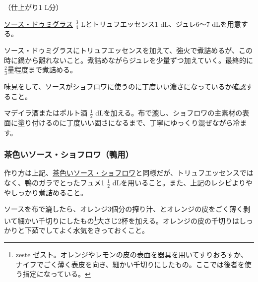 \begin{recette}


（仕上がり1 L分）

\protect\hyperlink{sauce-demi-glace}{ソース・ドゥミグラス}
\(\frac{3}{4}\) Lとトリュフエッセンス1 dL、ジュレ6〜7 dLを用意する。

ソース・ドゥミグラスにトリュフエッセンスを加えて、強火で煮詰めるが、この時に鍋から離れないこと。煮詰めながらジュレを少量ずつ加えていく。最終的に\(\frac{2}{3}\)量程度まで煮詰める。

味見をして、ソースがショフロワに使うのに丁度いい濃さになっているか確認すること。

マデイラ酒またはポルト酒 \(\frac{1}{2}\)
dLを加える。布で漉し、ショフロワの主素材の表面に塗り付けるのに丁度いい固さになるまで、丁寧にゆっくり混ぜながら冷ます。

\atoaki{}

\hypertarget{sauce-chaud-froid-brune-pour-canards}{%
\subsubsection{茶色いソース・ショフロワ（鴨用）}\label{sauce-chaud-froid-brune-pour-canards}}



作り方は上記、\protect\hyperlink{sauce-chaud-froid-brune}{茶色いソース・ショフロワ}と同様だが、トリュフエッセンスではなく、鴨のガラでとったフュメ1
\(\frac{1}{2}\)
dLを用いること。また、上記のレシピよりややしっかり煮詰めること。

ソースを布で漉したら、オレンジ3個分の搾り汁、とオレンジの皮をごく薄く剥いて細かい千切りにしたもの\footnote{zeste
  ゼスト。オレンジやレモンの皮の表面を器具を用いてすりおろすか、ナイフでごく薄く表皮を向き、細かい千切りにしたもの。ここでは後者を使う指定になっている。}大さじ2杯を加える。オレンジの皮の千切りはしっかりと下茹でしてよく水気をきっておくこと。


\end{recette}
